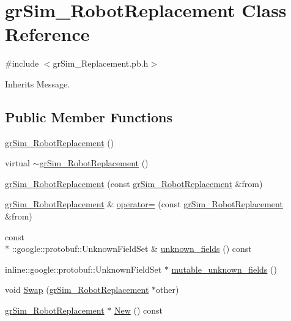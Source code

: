 \hypertarget{classgr_sim___robot_replacement}{\section{gr\-Sim\-\_\-\-Robot\-Replacement Class Reference}
\label{classgr_sim___robot_replacement}
}


{\ttfamily \#include $<$gr\-Sim\-\_\-\-Replacement.\-pb.\-h$>$}



Inherits Message.

\subsection*{Public Member Functions}
\begin{DoxyCompactItemize}
\item 
\hyperlink{classgr_sim___robot_replacement_a2e675c4755975d77ce6f7348c46d3b1d}{gr\-Sim\-\_\-\-Robot\-Replacement} ()
\item 
virtual \hyperlink{classgr_sim___robot_replacement_a55841fe5e78164940331cb5d137d916e}{$\sim$gr\-Sim\-\_\-\-Robot\-Replacement} ()
\item 
\hyperlink{classgr_sim___robot_replacement_ad583f3d3f19b2c02706104ec964000c8}{gr\-Sim\-\_\-\-Robot\-Replacement} (const \hyperlink{classgr_sim___robot_replacement}{gr\-Sim\-\_\-\-Robot\-Replacement} \&from)
\item 
\hyperlink{classgr_sim___robot_replacement}{gr\-Sim\-\_\-\-Robot\-Replacement} \& \hyperlink{classgr_sim___robot_replacement_a2d005b480dec17c98f2056091f479e6c}{operator=} (const \hyperlink{classgr_sim___robot_replacement}{gr\-Sim\-\_\-\-Robot\-Replacement} \&from)
\item 
const \\*
\-::google\-::protobuf\-::\-Unknown\-Field\-Set \& \hyperlink{classgr_sim___robot_replacement_a7128622825c3a0045de7f50574e34297}{unknown\-\_\-fields} () const 
\item 
inline\-::google\-::protobuf\-::\-Unknown\-Field\-Set $\ast$ \hyperlink{classgr_sim___robot_replacement_ae783b9b1de6b2384086c36cd7f7816d4}{mutable\-\_\-unknown\-\_\-fields} ()
\item 
void \hyperlink{classgr_sim___robot_replacement_abd95074604ac37e6efea260e8a420dc1}{Swap} (\hyperlink{classgr_sim___robot_replacement}{gr\-Sim\-\_\-\-Robot\-Replacement} $\ast$other)
\item 
\hyperlink{classgr_sim___robot_replacement}{gr\-Sim\-\_\-\-Robot\-Replacement} $\ast$ \hyperlink{classgr_sim___robot_replacement_ab1a829b31646d12886e70a4b48a5ca77}{New} () const 

\end{DoxyCompactItemize}
